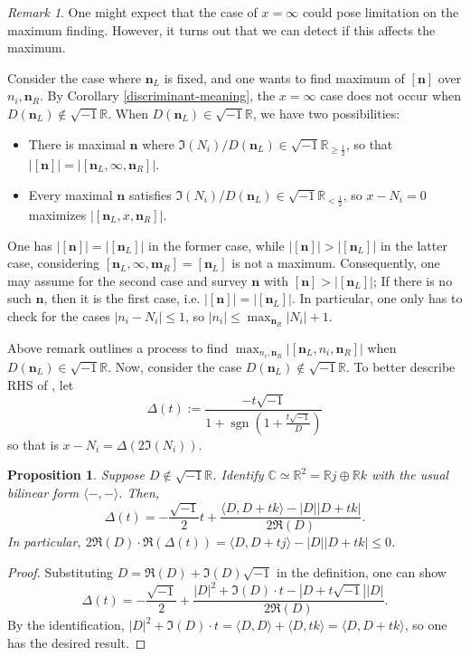 \documentclass{article}
\theoremstyle{definition}
\theoremstyle{plain}
\newtheorem{proposition}{Proposition}
\theoremstyle{remark}
\newtheorem*{remark}{Remark}
\numberwithin{equation}{section}
\newcommand{\bR}{\mathbb{R}}
\newcommand{\bC}{\mathbb{C}}
\newcommand{\abs}[1]{\left| {#1} \right|}
\newcommand{\inprod}[2]{\langle {#1}, {#2} \rangle}
\newcommand{\im}{{\sqrt{-1}}}
\DeclareMathOperator{\sgn}{sgn}
\def\ns{{\mathbf{n}}}
\def\nsL{{\mathbf{n}_L}}
\def\nsR{{\mathbf{n}_R}}
\begin{document}
\begin{remark}
  One might expect that the case of $x = \infty$ could pose limitation on the maximum finding.
  However, it turns out that we can detect if this affects the maximum.

  Consider the case where $\nsL$ is fixed, and one wants to find maximum of $[\ns]$ over $n_i, \nsR$.
  By Corollary \ref{discriminant-meaning}, the $x = \infty$ case does not occur when $D(\nsL) \notin \im \bR$.
  When $D(\nsL) \in \im \bR$, we have two possibilities:
  \begin{itemize}
    \item There is maximal $\ns$ where $\Im(N_i) / D(\nsL) \in \im \bR_{\geq \frac{1}{2}}$,
          so that $\abs{[\ns]} = \abs{[\nsL, \infty, \nsR]}$.
    \item Every maximal $\ns$ satisfies $\Im(N_i) / D(\nsL) \in \im \bR_{< \frac{1}{2}}$,
          so $x - N_i = 0$ maximizes $\abs{[\nsL, x, \nsR]}$.
  \end{itemize}
  One has $\abs{[\ns]} = \abs{[\nsL]}$ in the former case,
  while $\abs{[\ns]} > \abs{[\nsL]}$ in the latter case,
  considering $[\nsL, \infty, \mathbf{m}_R] = [\nsL]$ is not a maximum.
  Consequently, one may assume for the second case and survey $\ns$ with $[\ns] > \abs{[\nsL]}$;
  If there is no such $\ns$, then it is the first case, i.e. $\abs{[\ns]} = \abs{[\nsL]}$.
  In particular, one only has to check for the cases $\abs{n_i - N_i} \leq 1$,
  so $\abs{n_i} \leq \max_{\nsR} \abs{N_i} + 1$.
\end{remark}

Above remark outlines a process to find $\max_{n_i, \nsR} \abs{[\nsL, n_i, \nsR]}$ when $D(\nsL) \in \im \bR$.
Now, consider the case $D(\nsL) \notin \im \bR$.
To better describe RHS of , let
\[ \Delta(t) := \frac{-t \im}{1 + \sgn(1 + \frac{t \im}{D})} \]
so that  is $x - N_i = \Delta(2 \Im(N_i))$.

\begin{proposition}
  Suppose $D \notin \im \bR$.
  Identify $\bC \simeq \bR^2 = \bR j \oplus \bR k$ with the usual bilinear form $\inprod{-}{-}$.
  Then,
  \[
    \Delta(t) = - \frac{\im}{2} t + \frac{\inprod{D}{D + t k} - |D| |D + t k|}{2 \Re(D)}.
  \]
  In particular, $2 \Re(D) \cdot \Re(\Delta(t)) = \inprod{D}{D + t j} - |D| |D + t k| \leq 0$.
\end{proposition}
\begin{proof}
  Substituting $D = \Re(D) + \Im(D) \im$ in the definition, one can show
  \[
    \Delta(t) = - \frac{\im}{2} + \frac{|D|^2 + \Im(D) \cdot t - |D + t \im| |D|}{2 \Re(D)}.
  \]
  By the identification, $|D|^2 + \Im(D) \cdot t = \inprod{D}{D} + \inprod{D}{t k} = \inprod{D}{D + tk}$,
  so one has the desired result.
\end{proof}
\end{document}
